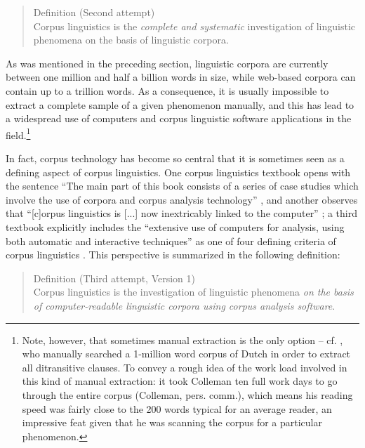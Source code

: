 \begin{samepage}
\begin{quotation}
Definition (Second attempt) \\
Corpus linguistics is the \emph{complete and systematic} investigation of linguistic phenomena on the basis of linguistic corpora.
\end{quotation}
\end{samepage}

As was mentioned in the preceding section, linguistic corpora are currently between one million and half a billion words in size,  while web\hyp{}based corpora can contain up to a trillion words. As a consequence, it is usually impossible to extract  a complete sample  of a given phenomenon manually,  and this has lead to a widespread use of computers and corpus linguistic software applications in the field.\footnote{Note, however, that sometimes manual  extraction  is the only option -- cf. \citet{colleman_nederlandse_2006,colleman_verb_2009}, who manually searched a 1\hyp{}million word corpus of Dutch in order to extract all ditransitive  clauses. To convey a rough idea of the work load involved in this kind of manual extraction: it took Colleman ten full work days to go through the entire corpus (Colleman, pers. comm.), which means his reading speed was fairly close to the 200 words typical for an average reader, an impressive feat given that he was scanning the corpus for a particular phenomenon.}

In fact, corpus technology has become so central that it is sometimes seen as a defining aspect of corpus linguistics. One corpus linguistics textbook opens with the sentence ``The main part of this book consists of a series of case studies which involve the use of corpora and corpus analysis technology'' \citep[1]{partington_patterns_1998}, and another observes that ``[c]orpus linguistics is [...] now inextricably linked to the computer'' \citep[5]{kennedy_introduction_1998}; a third textbook explicitly includes the ``extensive use of computers for analysis, using both automatic and interactive techniques'' as one of four defining criteria of corpus linguistics \cite[4]{biber_corpus_1998}. This perspective is summarized in the following definition:

\begin{quotation}
Definition (Third attempt, Version 1) \\
Corpus linguistics is the investigation of linguistic phenomena \emph{on the basis of computer\hyp{}readable linguistic corpora using corpus analysis software}.
\end{quotation}

